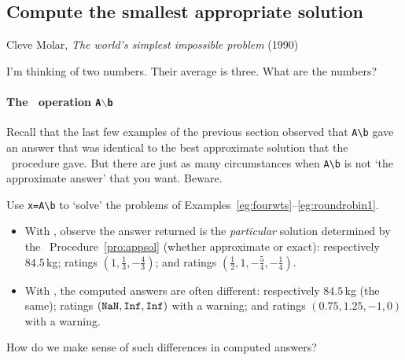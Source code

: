 \subsection{Compute the smallest appropriate solution}
\label{sec:csap}

\begin{quoted}{\parbox[t]{0.5\linewidth}{Cleve Molar, \emph{The world's simplest impossible problem} (1990)}}
I'm thinking of two numbers.  Their average is three.  What are the numbers?
\end{quoted}

\begin{comment}
Chapter~20 of the book by \cite{Higham1996} has some aspects of this section (including pseudo-inverse).
Matlab and Octave currently differ in that octave returns the smallest solution, but matlab returns a solution with at least \(m\)~non-zero elements??
\end{comment}

\paragraph{The \script\ operation \texttt{A$\backslash$b}}
Recall that the last few examples of the previous section observed that \verb|A\b| gave an answer that was identical to the best approximate solution that the \svd\ procedure gave.
But there are just as many circumstances when \verb|A\b| is not `the approximate answer' that you want.
Beware.


\begin{example} \label{eg:}
Use \verb|x=A\b| to `solve' the problems of Examples~\ref{eg:fourwts}--\ref{eg:roundrobin1}.
\begin{itemize}
\item With \script[2], observe the answer returned is the \emph{particular} solution determined by the \svd\ Procedure~\ref{pro:appsol} (whether approximate or exact): 
respectively \(84.5\)\,kg; 
ratings \((1,\frac13,-\frac43)\); and 
ratings \((\frac12,1,-\frac54,-\frac14)\). %
\item With \script[1], the computed answers are often different: 
respectively \(84.5\)\,kg (the same); 
ratings \((\verb|NaN|,\verb|Inf|,\verb|Inf|)\) with a warning; 
and ratings \((0.75,1.25,-1,0)\) with a warning. %
\end{itemize}
How do we make sense of such differences in computed answers?
\end{example}

